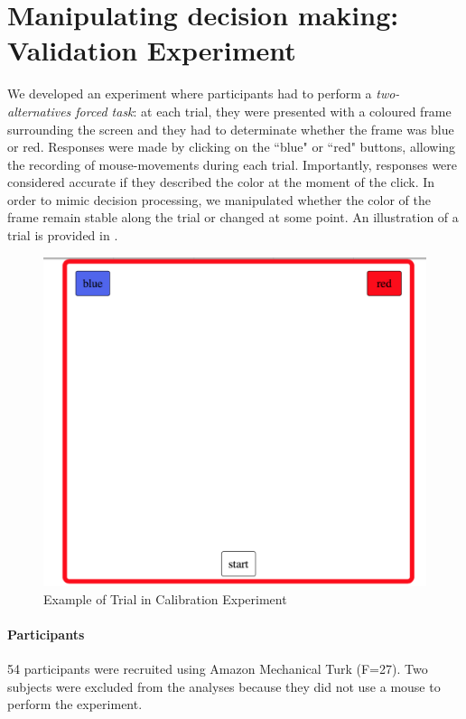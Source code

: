 \documentclass{article}
\begin{document}
\section{Manipulating decision making: Validation Experiment}
We developed an experiment where participants had to perform a \emph{two-alternatives forced task}: at each trial, they were presented with a coloured frame surrounding the screen and they had to determinate whether the frame was blue or red. 
Responses were made by clicking on the ``blue" or ``red" buttons, allowing the recording of mouse-movements during each trial. Importantly, responses were considered accurate if they described the color at the moment of the click. In order to mimic decision processing, we manipulated whether the color of the frame remain stable along the trial or changed at some point. An illustration of a trial is provided in . 


\begin{figure}
\centering
\includegraphics[scale=.2]{example_trial.png}
\caption{Example of Trial in Calibration Experiment} \label{fig:trial.example}
\end{figure}

\paragraph{Participants} 54 participants were recruited using Amazon Mechanical Turk (F=27). Two subjects were excluded from the analyses because they did not use a mouse to perform the experiment. 
\end{document}
